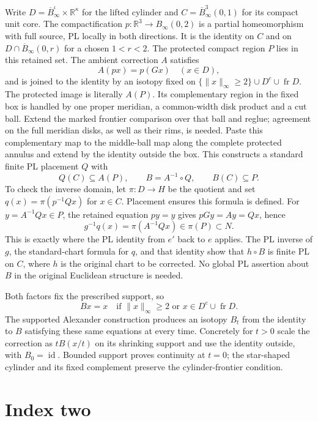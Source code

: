 Write $D=\overline B^\iota_\infty\times\mathbb R^\kappa$ for the
lifted cylinder and $C=\overline B^3_\infty(0,1)$ for its compact unit core.
The compactification $p:\mathbb R^3\to B_\infty(0,2)$ is a partial
homeomorphism with full source, PL locally in both directions. It is
the identity on $C$ and on $D\cap\overline B_\infty(0,r)$ for a chosen
$1<r<2$. The protected compact region $P$ lies in this retained set.
The ambient
correction $A$ satisfies
\[
 A(px)=p(Gx)\quad(x\in D),
\]
and is joined to the identity by an isotopy fixed on
$\{\|x\|_\infty\geq2\}\cup D^c\cup\operatorname{fr}D$.
The protected image is literally $A(P)$. Its complementary region in
the fixed box is handled by one proper meridian, a common-width disk
product and a cut ball. Extend the marked frontier comparison over
that ball and reglue; agreement on the full meridian disks, as well as
their rims, is needed. Paste this complementary map to the middle-ball
map along the complete protected annulus and extend by the identity
outside the box. This constructs a standard finite PL placement $Q$
with
\[
 Q(C)\subseteq A(P),\qquad
 B=A^{-1}\circ Q,\qquad B(C)\subseteq P.
\]
To check the inverse domain, let $\pi:D\to H$ be the quotient and set
$q(x)=\pi(p^{-1}Qx)$ for $x\in C$. Placement ensures this formula is
defined. For $y=A^{-1}Qx\in P$, the retained equation $py=y$ gives
$pGy=Ay=Qx$, hence
\[
 g^{-1}q(x)=\pi(A^{-1}Qx)\in\pi(P)\subset N.
\]
This is exactly where the PL identity from $e'$ back to $e$ applies.
The PL inverse of $g$, the standard-chart formula for $q$, and that
identity show that $h\circ B$ is finite PL on $C$, where $h$ is the
original chart to be corrected. No global PL assertion about $B$
in the original Euclidean structure is needed.

Both factors fix the prescribed support, so
\[
 Bx=x\quad\text{if }\|x\|_\infty\geq2
 \text{ or }x\in D^c\cup\operatorname{fr}D.
\]
The supported Alexander construction produces an isotopy $B_t$ from
the identity to $B$ satisfying these same equations at every time.
Concretely for $t>0$ scale the correction as $tB(x/t)$ on its shrinking
support and use the identity outside, with $B_0=\operatorname{id}$.
Bounded support proves continuity at $t=0$; the star-shaped cylinder
and its fixed complement preserve the cylinder-frontier condition.

\section{Index two}
\label{sec:relative-rigidity-index-two}
\label{sec:index-two}

